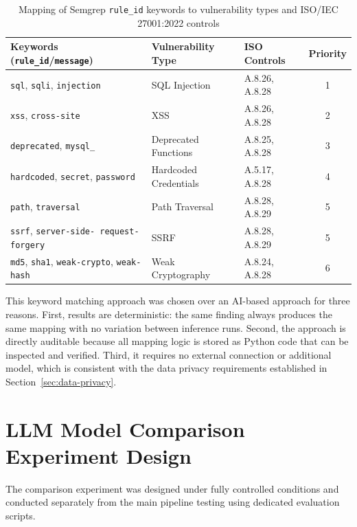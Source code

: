 \begin{table}[htbp]
\caption{Mapping of Semgrep \texttt{rule\_id} keywords to vulnerability types and ISO/IEC 27001:2022 controls}
\vspace{0.5em}
\centering
\label{tab:keyword-mapping}
\renewcommand{\arraystretch}{1.6}
\begin{tabularx}{\textwidth}{|>{\raggedright\arraybackslash}X|l|l|c|}
\hline
\textbf{Keywords (\texttt{rule\_id}/\texttt{message})} &
\textbf{Vulnerability Type} &
\textbf{ISO Controls} &
\textbf{Priority} \\
\hline \hline
\texttt{sql}, \texttt{sqli}, \texttt{injection} &
SQL Injection & A.8.26, A.8.28 & 1 \\
\hline
\texttt{xss}, \texttt{cross-site} &
XSS & A.8.26, A.8.28 & 2 \\
\hline
\texttt{deprecated}, \texttt{mysql\_} &
Deprecated Functions & A.8.25, A.8.28 & 3 \\
\hline
\texttt{hardcoded}, \texttt{secret}, \texttt{password} &
Hardcoded Credentials & A.5.17, A.8.28 & 4 \\
\hline
\texttt{path}, \texttt{traversal} &
Path Traversal & A.8.28, A.8.29 & 5 \\
\hline
\texttt{ssrf}, \texttt{server-side- request-forgery} &
SSRF & A.8.28, A.8.29 & 5 \\
\hline
\texttt{md5}, \texttt{sha1}, \texttt{weak-crypto}, \texttt{weak-hash} &
Weak Cryptography & A.8.24, A.8.28 & 6 \\
\hline
\end{tabularx}
\end{table}

This keyword matching approach was chosen over an AI-based approach for three reasons. First, results are deterministic: the same finding always produces the same mapping with no variation between inference runs. Second, the approach is directly auditable because all mapping logic is stored as Python code that can be inspected and verified. Third, it requires no external connection or additional model, which is consistent with the data privacy requirements established in Section~\ref{sec:data-privacy}.

\newpage
\section{LLM Model Comparison Experiment Design}

The comparison experiment was designed under fully controlled conditions and conducted separately from the main pipeline testing using dedicated evaluation scripts.


